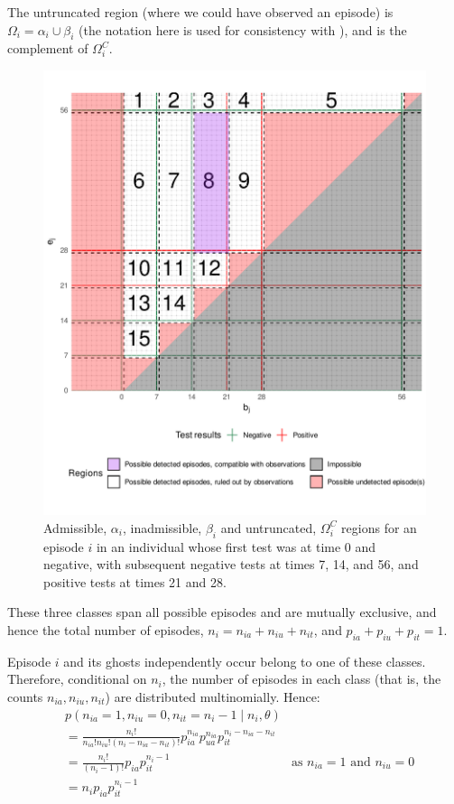 \documentclass[thesis.tex]{subfiles}
\begin{document}
The untruncated region (where we could have observed an episode) is
$\Omega_i = \alpha_i \cup \beta_i$ (the notation here is used for
consistency with \textcite{heiseyModelling}), and is the
complement of $\Omega^C_i$.

\begin{figure}
\includegraphics[width=\textwidth]{cis-perfect-testing/regions_diag}
\caption[Admissible, inadmissible, and untruncated infections]{Admissible, $\alpha_i$, inadmissible, $\beta_i$ and
untruncated, $\Omega_i^C$ regions for an episode $i$ in an
individual whose first test was at time 0 and negative, with subsequent
negative tests at times 7, 14, and 56, and positive tests at times 21
and 28. \label{perf-test:fig:partitionSpace}}
\end{figure}

These three classes span all possible episodes and are mutually
exclusive, and hence the total number of episodes,
$n_i = n_{ia} + n_{iu} + n_{it}$, and
$p_{ia} + p_{iu} + p_{it} = 1$.

Episode $i$ and its ghosts independently occur belong to one of these
classes. Therefore, conditional on $n_i$, the number of episodes in
each class (that is, the counts $n_{ia}, n_{iu}, n_{it}$) are
distributed multinomially. Hence:
\begin{align}
&p(n_{ia} = 1, n_{iu} = 0, n_{it} = n_i - 1 \mid n_i, \theta) \\
&= \frac{n_i!}{n_{ia}! n_{iu}! (n_i- n_{ia} - n_{it})!} p_{ia}^{n_{ia}} p_{ua}^{n_{ia}} p_{it}^{n_i- n_{ia} - n_{it}} \\
&= \frac{n_i!}{(n_i-1)!} p_{ia} p_{it}^{n_i- 1} &\text{as $n_{ia} = 1$ and $n_{iu} = 0$}\\
&= n_i p_{ia} p_{it}^{n_i- 1}
\end{align}
\end{document}
